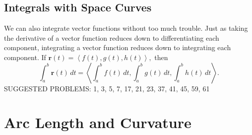 \documentclass[10pt,]{book}
\numberwithin{equation}{section}
\newcommand{\vv}[1]{\mathbf{#1}}
\newcommand{\dotprod}[1]{\left\langle #1 \right\rangle}
\begin{document}
\subsection[{Integrals with Space Curves}]{Integrals with Space Curves}\label{subsection-integrals-with-space-curves}
\hypertarget{p-1274}{}%
We can also integrate vector functions without too much trouble. Just as taking the derivative of a vector function reduces down to differentiating each component, integrating a vector function reduces down to integrating each component. If \(\vv{r}(t) = \dotprod{f(t),g(t),h(t)},\) then%
%
\begin{equation}
\int_{a}^{b}\vv{r}(t)\,dt = \dotprod{\int_{a}^{b}f(t)\,dt,\int_{a}^{b}g(t)\,dt,\int_{a}^{b}h(t)\,dt}.\label{equation-vector-function-integration}
\end{equation}
\hypertarget{p-1275}{}%
SUGGESTED PROBLEMS: 1, 3, 5, 7, 17, 21, 23, 37, 41, 45, 59, 61%
%
%
\typeout{************************************************}
\typeout{************************************************}
%
\section[{Arc Length and Curvature}]{Arc Length and Curvature}\label{section-arc-length-and-curvature}
%
%
\typeout{************************************************}
\typeout{************************************************}
%
\end{document}
